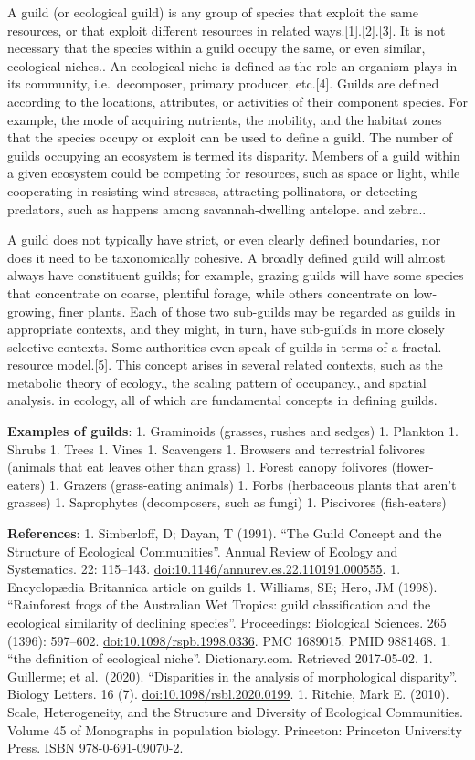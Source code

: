 \documentclass[
]{book}
\begin{document}
A guild (or ecological guild) is any group of species that exploit the same resources, or that exploit different resources in related ways.{[}1{]}.{[}2{]}.{[}3{]}. It is not necessary that the species within a guild occupy the same, or even similar, ecological niches.. An ecological niche is defined as the role an organism plays in its community, i.e.~decomposer, primary producer, etc.{[}4{]}. Guilds are defined according to the locations, attributes, or activities of their component species. For example, the mode of acquiring nutrients, the mobility, and the habitat zones that the species occupy or exploit can be used to define a guild. The number of guilds occupying an ecosystem is termed its disparity. Members of a guild within a given ecosystem could be competing for resources, such as space or light, while cooperating in resisting wind stresses, attracting pollinators, or detecting predators, such as happens among savannah-dwelling antelope. and zebra..

A guild does not typically have strict, or even clearly defined boundaries, nor does it need to be taxonomically cohesive. A broadly defined guild will almost always have constituent guilds; for example, grazing guilds will have some species that concentrate on coarse, plentiful forage, while others concentrate on low-growing, finer plants. Each of those two sub-guilds may be regarded as guilds in appropriate contexts, and they might, in turn, have sub-guilds in more closely selective contexts. Some authorities even speak of guilds in terms of a fractal. resource model.{[}5{]}. This concept arises in several related contexts, such as the metabolic theory of ecology., the scaling pattern of occupancy., and spatial analysis. in ecology, all of which are fundamental concepts in defining guilds.

\textbf{Examples of guilds}:
1. Graminoids (grasses, rushes and sedges)
1. Plankton
1. Shrubs
1. Trees
1. Vines
1. Scavengers
1. Browsers and terrestrial folivores (animals that eat leaves other than grass)
1. Forest canopy folivores (flower-eaters)
1. Grazers (grass-eating animals)
1. Forbs (herbaceous plants that aren't grasses)
1. Saprophytes (decomposers, such as fungi)
1. Piscivores (fish-eaters)

\textbf{References}:
1. Simberloff, D; Dayan, T (1991). ``The Guild Concept and the Structure of Ecological Communities''. Annual Review of Ecology and Systematics. 22: 115--143. \url{doi:10.1146/annurev.es.22.110191.000555}.
1. Encyclopædia Britannica article on guilds
1. Williams, SE; Hero, JM (1998). ``Rainforest frogs of the Australian Wet Tropics: guild classification and the ecological similarity of declining species''. Proceedings: Biological Sciences. 265 (1396): 597--602. \url{doi:10.1098/rspb.1998.0336}. PMC 1689015. PMID 9881468.
1. ``the definition of ecological niche''. Dictionary.com. Retrieved 2017-05-02.
1. Guillerme; et al.~(2020). ``Disparities in the analysis of morphological disparity''. Biology Letters. 16 (7). \url{doi:10.1098/rsbl.2020.0199}.
1. Ritchie, Mark E. (2010). Scale, Heterogeneity, and the Structure and Diversity of Ecological Communities. Volume 45 of Monographs in population biology. Princeton: Princeton University Press. ISBN 978-0-691-09070-2.
\end{document}
